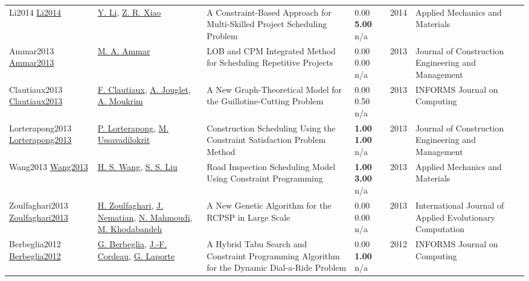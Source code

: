 {\begin{longtable}{p{3cm}p{5cm}p{10cm}p{1cm}rp{2.5cm}l}
Li2014 \href{http://dx.doi.org/10.4028/www.scientific.net/amm.681.265}{Li2014} & \hyperref[auth:a1490]{Y. Li}, \hyperref[auth:a1491]{Z. R. Xiao} & A Constraint-Based Approach for Multi-Skilled Project Scheduling Problem & \noindent{}\textcolor{black!50}{0.00} \textbf{5.00} n/a & 2014 & Applied Mechanics and Materials & \cite{Li2014}\\
Ammar2013 \href{http://dx.doi.org/10.1061/(asce)co.1943-7862.0000569}{Ammar2013} & \hyperref[auth:a1776]{M. A. Ammar} & LOB and CPM Integrated Method for Scheduling Repetitive Projects & \noindent{}\textcolor{black!50}{0.00} \textcolor{black!50}{0.00} n/a & 2013 & Journal of Construction Engineering and Management & \cite{Ammar2013}\\
Clautiaux2013 \href{http://dx.doi.org/10.1287/ijoc.1110.0478}{Clautiaux2013} & \hyperref[auth:a1684]{F. Clautiaux}, \hyperref[auth:a928]{A. Jouglet}, \hyperref[auth:a1169]{A. Moukrim} & A New Graph-Theoretical Model for the Guillotine-Cutting Problem & \noindent{}\textcolor{black!50}{0.00} 0.50 n/a & 2013 & \cellcolor{red!20}INFORMS Journal on Computing & \cite{Clautiaux2013}\\
Lorterapong2013 \href{http://dx.doi.org/10.1061/(asce)co.1943-7862.0000582}{Lorterapong2013} & \hyperref[auth:a1789]{P. Lorterapong}, \hyperref[auth:a1790]{M. Ussavadilokrit} & Construction Scheduling Using the Constraint Satisfaction Problem Method & \noindent{}\textbf{1.00} \textbf{1.00} n/a & 2013 & Journal of Construction Engineering and Management & \cite{Lorterapong2013}\\
Wang2013 \href{http://dx.doi.org/10.4028/www.scientific.net/amm.357-360.2720}{Wang2013} & \hyperref[auth:a1900]{H. S. Wang}, \hyperref[auth:a1901]{S. S. Liu} & Road Inspection Scheduling Model Using Constraint Programming & \noindent{}\textbf{1.00} \textbf{3.00} n/a & 2013 & Applied Mechanics and Materials & \cite{Wang2013}\\
Zoulfaghari2013 \href{http://dx.doi.org/10.4018/jaec.2013040103}{Zoulfaghari2013} & \hyperref[auth:a1755]{H. Zoulfaghari}, \hyperref[auth:a1756]{J. Nematian}, \hyperref[auth:a1757]{N. Mahmoudi}, \hyperref[auth:a1758]{M. Khodabandeh} & A New Genetic Algorithm for the RCPSP in Large Scale & \noindent{}\textcolor{black!50}{0.00} \textcolor{black!50}{0.00} n/a & 2013 & International Journal of Applied Evolutionary Computation & \cite{Zoulfaghari2013}\\
Berbeglia2012 \href{http://dx.doi.org/10.1287/ijoc.1110.0454}{Berbeglia2012} & \hyperref[auth:a1844]{G. Berbeglia}, \hyperref[auth:a1845]{J.-F. Cordeau}, \hyperref[auth:a1073]{G. Laporte} & A Hybrid Tabu Search and Constraint Programming Algorithm for the Dynamic Dial-a-Ride Problem & \noindent{}\textcolor{black!50}{0.00} \textbf{1.00} n/a & 2012 & \cellcolor{red!20}INFORMS Journal on Computing & \cite{Berbeglia2012}\\

\end{longtable}}
